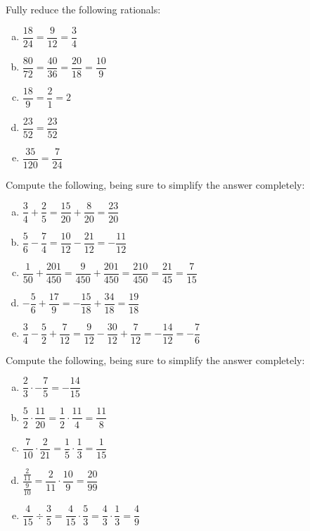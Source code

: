 \documentclass[11pt,letterpaper]{article}
\begin{document}
\vfill





 Fully reduce the following rationals: \pspace
\begin{enumerate}[(a)] \itemsep=2ex
\item $\dfrac{18}{24}= \dfrac{9}{12}= \dfrac{3}{4}$
\item $\dfrac{80}{72}= \dfrac{40}{36}= \dfrac{20}{18}= \dfrac{10}{9}$
\item $\dfrac{18}{9}= \dfrac{2}{1}= 2$
\item $\dfrac{23}{52}= \dfrac{23}{52}$
\item $\dfrac{35}{120}= \dfrac{7}{24}$
\end{enumerate} \pspace





\vfill
\newpage





 Compute the following, being sure to simplify the answer completely: \pspace
\begin{enumerate}[(a)] \itemsep=2ex
\item $\dfrac{3}{4} + \dfrac{2}{5}= \dfrac{15}{20} + \dfrac{8}{20}= \dfrac{23}{20}$
\item $\dfrac{5}{6} - \dfrac{7}{4}= \dfrac{10}{12} - \dfrac{21}{12}= -\dfrac{11}{12}$
\item $\dfrac{1}{50} + \dfrac{201}{450}= \dfrac{9}{450} + \dfrac{201}{450}= \dfrac{210}{450}= \dfrac{21}{45}= \dfrac{7}{15}$
\item $-\dfrac{5}{6} + \dfrac{17}{9}= -\dfrac{15}{18} + \dfrac{34}{18}= \dfrac{19}{18}$
\item $\dfrac{3}{4} - \dfrac{5}{2} + \dfrac{7}{12}= \dfrac{9}{12} - \dfrac{30}{12} + \dfrac{7}{12}= -\dfrac{14}{12}= -\dfrac{7}{6}$
\end{enumerate}





\vfill





 Compute the following, being sure to simplify the answer completely:
\begin{enumerate}[(a)] \itemsep=2ex
\item $\dfrac{2}{3} \cdot -\dfrac{7}{5}= -\dfrac{14}{15}$
\item $\dfrac{5}{2} \cdot \dfrac{11}{20}= \dfrac{1}{2} \cdot \dfrac{11}{4}= \dfrac{11}{8}$
\item $\dfrac{7}{10} \cdot \dfrac{2}{21}= \dfrac{1}{5} \cdot \dfrac{1}{3}= \dfrac{1}{15}$
\item $\dfrac{\frac{2}{11}}{\frac{9}{10}}= \dfrac{2}{11} \cdot \dfrac{10}{9}= \dfrac{20}{99}$
\item $\dfrac{4}{15} \div \dfrac{3}{5}= \dfrac{4}{15} \cdot \dfrac{5}{3}= \dfrac{4}{3} \cdot \dfrac{1}{3}= \dfrac{4}{9}$
\end{enumerate}
\end{document}
